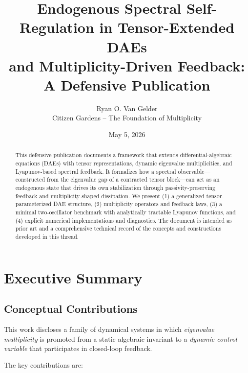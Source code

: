 \documentclass[11pt]{article}
\title{Endogenous Spectral Self-Regulation in Tensor-Extended DAEs\\
and Multiplicity-Driven Feedback:\\
A Defensive Publication}
\author{Ryan O. Van Gelder\\Citizen Gardens -- The Foundation of Multiplicity}
\date{May 5, 2026}
\begin{document}
\maketitle

\begin{abstract}
This defensive publication documents a framework that extends differential-algebraic equations (DAEs) with tensor representations, dynamic eigenvalue multiplicities, and Lyapunov-based spectral feedback. It formalizes how a spectral observable---constructed from the eigenvalue gap of a contracted tensor block---can act as an endogenous state that drives its own stabilization through passivity-preserving feedback and multiplicity-shaped dissipation. We present (1) a generalized tensor-parameterized DAE structure, (2) multiplicity operators and feedback laws, (3) a minimal two-oscillator benchmark with analytically tractable Lyapunov functions, and (4) explicit numerical implementations and diagnostics. The document is intended as prior art and a comprehensive technical record of the concepts and constructions developed in this thread.
\end{abstract}
\newpage
\tableofcontents

\section{Executive Summary}

\subsection{Conceptual Contributions}

This work discloses a family of dynamical systems in which \emph{eigenvalue multiplicity} is promoted from a static algebraic invariant to a \emph{dynamic control variable} that participates in closed-loop feedback.

The key contributions are:
\end{document}
